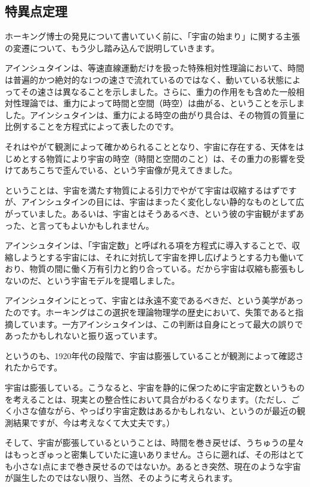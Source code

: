 \documentclass[10pt,b5paper,papersize,dvipdfmx]{jsbook}
\begin{document}
\subsection{特異点定理}
ホーキング博士の発見について書いていく前に、「宇宙の始まり」に関する主張の変遷について、もう少し踏み込んで説明していきます。\par
アインシュタインは、等速直線運動だけを扱った特殊相対性理論において、時間は普遍的かつ絶対的な1つの速さで流れているのではなく、動いている状態によってその速さは異なることを示しました。さらに、重力の作用をも含めた一般相対性理論では、重力によって時間と空間（時空）は曲がる、ということを示しました。アインシュタインは、重力による時空の曲がり具合は、その物質の質量に比例することを方程式によって表したのです。\par
それはやがて観測によって確かめられることとなり、宇宙に存在する、天体をはじめとする物質により宇宙の時空（時間と空間のこと）は、その重力の影響を受けてあちこちで歪んでいる、という宇宙像が見えてきました。\par
ということは、宇宙を満たす物質による引力でやがて宇宙は収縮するはずですが、アインシュタインの目には、宇宙はまったく変化しない静的なものとして広がっていました。あるいは、宇宙とはそうあるべき、という彼の宇宙観がまずあった、と言ってもよいかもしれません。\par
アインシュタインは、「宇宙定数」と呼ばれる項を方程式に導入することで、収縮しようとする宇宙には、それに対抗して宇宙を押し広げようとする力も働いており、物質の間に働く万有引力と釣り合っている。だから宇宙は収縮も膨張もしないのだ、という宇宙モデルを提唱しました。\par
アインシュタインにとって、宇宙とは永遠不変であるべきだ、という美学があったのです。ホーキングはこの選択を理論物理学の歴史において、失策であると指摘しています。一方アインシュタインは、この判断は自身にとって最大の誤りであったかもしれないと振り返っています。\par
というのも、1920年代の段階で、宇宙は膨張していることが観測によって確認されたからです。\par
宇宙は膨張している。こうなると、宇宙を静的に保つために宇宙定数というものを考えることは、現実との整合性において具合がわるくなります。（ただし、ごく小さな値ながら、やっぱり宇宙定数はあるかもしれない、というのが最近の観測結果ですが、今は考えなくて大丈夫です。）\par
そして、宇宙が膨張しているということは、時間を巻き戻せば、うちゅうの星々はもっとぎゅっと密集していたに違いありません。さらに遡れば、その形はとても小さな1点にまで巻き戻せるのではないか。あるとき突然、現在のような宇宙が誕生したのではない限り、当然、そのように考えられます。\par
\end{document}
